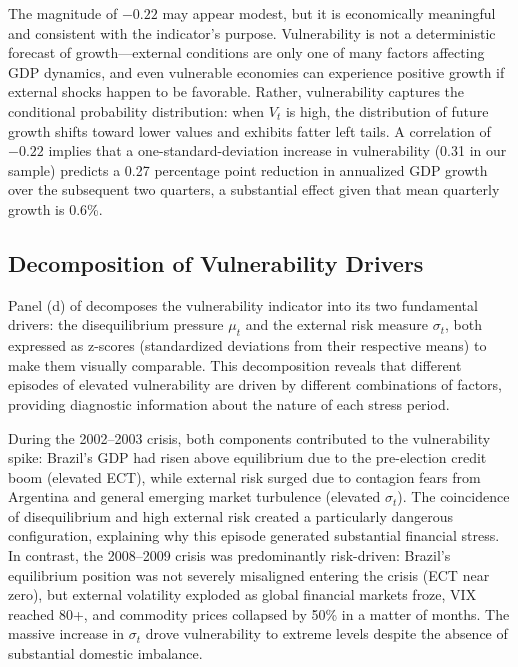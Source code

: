 \documentclass[12pt,a4paper]{article}
\numberwithin{equation}{section}
\theoremstyle{definition}
\theoremstyle{remark}
\begin{document}
The magnitude of $-0.22$ may appear modest, but it is economically meaningful and consistent with the indicator's purpose. Vulnerability is not a deterministic forecast of growth---external conditions are only one of many factors affecting GDP dynamics, and even vulnerable economies can experience positive growth if external shocks happen to be favorable. Rather, vulnerability captures the conditional probability distribution: when $V_t$ is high, the distribution of future growth shifts toward lower values and exhibits fatter left tails. A correlation of $-0.22$ implies that a one-standard-deviation increase in vulnerability (0.31 in our sample) predicts a 0.27 percentage point reduction in annualized GDP growth over the subsequent two quarters, a substantial effect given that mean quarterly growth is 0.6\%.


\subsection{Decomposition of Vulnerability Drivers}

Panel (d) of  decomposes the vulnerability indicator into its two fundamental drivers: the disequilibrium pressure $\mu_t$ and the external risk measure $\sigma_t$, both expressed as z-scores (standardized deviations from their respective means) to make them visually comparable. This decomposition reveals that different episodes of elevated vulnerability are driven by different combinations of factors, providing diagnostic information about the nature of each stress period.

During the 2002--2003 crisis, both components contributed to the vulnerability spike: Brazil's GDP had risen above equilibrium due to the pre-election credit boom (elevated ECT), while external risk surged due to contagion fears from Argentina and general emerging market turbulence (elevated $\sigma_t$). The coincidence of disequilibrium and high external risk created a particularly dangerous configuration, explaining why this episode generated substantial financial stress. In contrast, the 2008--2009 crisis was predominantly risk-driven: Brazil's equilibrium position was not severely misaligned entering the crisis (ECT near zero), but external volatility exploded as global financial markets froze, VIX reached 80+, and commodity prices collapsed by 50\% in a matter of months. The massive increase in $\sigma_t$ drove vulnerability to extreme levels despite the absence of substantial domestic imbalance.
\end{document}
